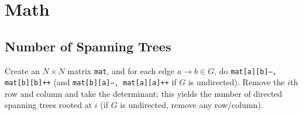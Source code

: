 \section{Math}
	\subsection{Number of Spanning Trees}
		Create an $N\times N$ matrix \texttt{mat}, and for each edge $a \rightarrow b \in G$, do
		\texttt{mat[a][b]--, mat[b][b]++} (and \texttt{mat[b][a]--, mat[a][a]++} if $G$ is undirected).
		Remove the $i$th row and column and take the determinant; this yields the number of directed spanning trees rooted at $i$
		(if $G$ is undirected, remove any row/column).

